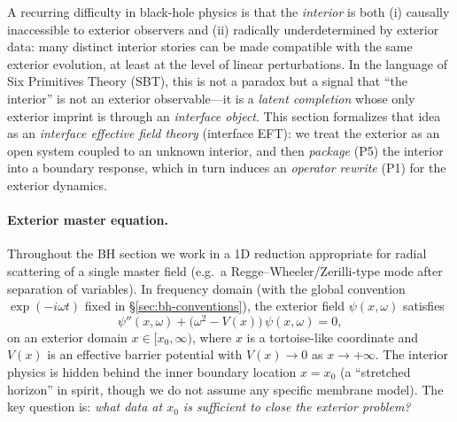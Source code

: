 
A recurring difficulty in black-hole physics is that the \emph{interior} is both (i) causally inaccessible to exterior observers and (ii) radically underdetermined by exterior data: many distinct interior stories can be made compatible with the same exterior evolution, at least at the level of linear perturbations. In the language of Six Primitives Theory (SBT), this is not a paradox but a signal that ``the interior'' is not an exterior observable---it is a \emph{latent completion} whose only exterior imprint is through an \emph{interface object}. This section formalizes that idea as an \emph{interface effective field theory} (interface EFT): we treat the exterior as an open system coupled to an unknown interior, and then \emph{package} (P5) the interior into a boundary response, which in turn induces an \emph{operator rewrite} (P1) for the exterior dynamics.

\paragraph{Exterior master equation.}
Throughout the BH section we work in a 1D reduction appropriate for radial scattering of a single master field (e.g.\ a Regge--Wheeler/Zerilli-type mode after separation of variables). In frequency domain (with the global convention $\exp(-i\omega t)$ fixed in \S\ref{sec:bh-conventions}), the exterior field $\psi(x,\omega)$ satisfies
\begin{equation}
  \psi''(x,\omega) + \big(\omega^2 - V(x)\big)\,\psi(x,\omega) = 0,
  \label{eq:bh-master}
\end{equation}
on an exterior domain $x\in[x_0,\infty)$, where $x$ is a tortoise-like coordinate and $V(x)$ is an effective barrier potential with $V(x)\to 0$ as $x\to+\infty$. The interior physics is hidden behind the inner boundary location $x=x_0$ (a ``stretched horizon'' in spirit, though we do not assume any specific membrane model). The key question is: \emph{what data at $x_0$ is sufficient to close the exterior problem?}

